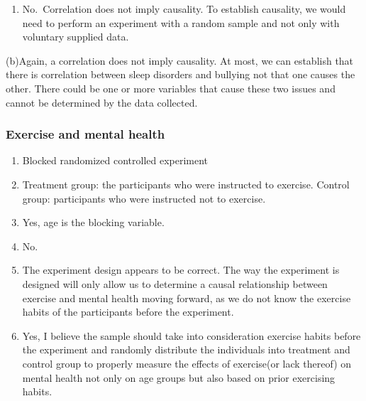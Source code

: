 \documentclass[
]{article}
\providecommand{\tightlist}{%
  \setlength{\itemsep}{0pt}\setlength{\parskip}{0pt}}
\begin{document}
\begin{enumerate}
\def\labelenumi{(\alph{enumi})}
\tightlist
\item
  No.~Correlation does not imply causality. To establish causality, we
  would need to perform an experiment with a random sample and not only
  with voluntary supplied data.
\end{enumerate}

(b)Again, a correlation does not imply causality. At most, we can
establish that there is correlation between sleep disorders and bullying
not that one causes the other. There could be one or more variables that
cause these two issues and cannot be determined by the data collected.

\hypertarget{exercise-and-mental-health}{%
\subsubsection{Exercise and mental
health}\label{exercise-and-mental-health}}

\begin{enumerate}
\def\labelenumi{(\alph{enumi})}
\tightlist
\item
  Blocked randomized controlled experiment
\item
  Treatment group: the participants who were instructed to exercise.
  Control group: participants who were instructed not to exercise.
\item
  Yes, age is the blocking variable.
\item
  No.~
\item
  The experiment design appears to be correct. The way the experiment is
  designed will only allow us to determine a causal relationship between
  exercise and mental health moving forward, as we do not know the
  exercise habits of the participants before the experiment.
\item
  Yes, I believe the sample should take into consideration exercise
  habits before the experiment and randomly distribute the individuals
  into treatment and control group to properly measure the effects of
  exercise(or lack thereof) on mental health not only on age groups but
  also based on prior exercising habits.
\end{enumerate}
\end{document}
